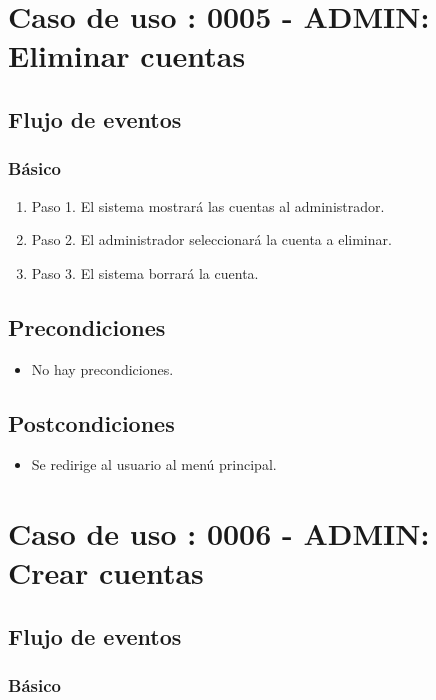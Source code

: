 \section{Caso de uso : 0005 - ADMIN: Eliminar cuentas}\label{sec:uc0}
\subsection{Flujo de eventos}
\subsubsection{Básico}

\begin{enumerate}
\item Paso 1.
El sistema mostrará las cuentas al administrador.
\item Paso 2.
El administrador seleccionará la cuenta a eliminar.
\item Paso 3.
El sistema borrará la cuenta.
\end{enumerate}

\subsection{Precondiciones}
\begin{itemize}
\item No hay precondiciones.
\end{itemize}

\subsection{Postcondiciones}
\begin{itemize}
\item Se redirige al usuario al menú principal.
\end{itemize}



\section{Caso de uso : 0006 - ADMIN: Crear cuentas}\label{sec:uc0}
\subsection{Flujo de eventos}
\subsubsection{Básico}

